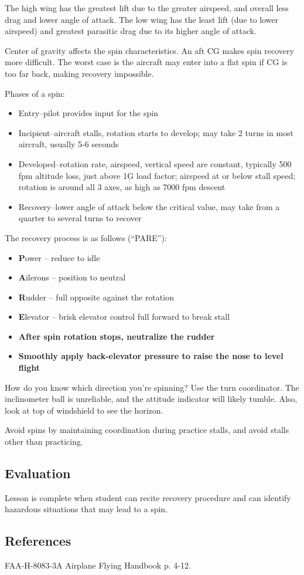 The high wing has the greatest lift due to the greater airspeed, and overall
less drag and lower angle of attack. The low wing has the least lift (due to
lower airspeed) and greatest parasitic drag due to its higher angle of attack.

Center of gravity affects the spin characteristics. An aft CG makes spin
recovery more difficult. The worst case is the aircraft may enter into a flat
spin if CG is too far back, making recovery impossible.

Phases of a spin:
\begin{itemize}
  \item Entry--pilot provides input for the spin
  \item Incipient--aircraft stalls, rotation starts to develop; may take 2
    turns in most aircraft, usually 5-6 seconds
  \item Developed--rotation rate, airspeed, vertical speed are constant,
    typically 500 fpm altitude loss, just above 1G load factor; airspeed at or
    below stall speed; rotation is around all 3 axes, as high as 7000 fpm
    descent
  \item Recovery--lower angle of attack below the critical value, may take from a
    quarter to several turns to recover
\end{itemize}

The recovery process is as follows (``PARE''):
\begin{itemize}
  \item \textbf{P}ower -- reduce to idle
  \item \textbf{A}ilerons -- position to neutral
  \item \textbf{R}udder -- full opposite against the rotation
  \item \textbf{E}levator -- brisk elevator control full forward to break stall
  \item \textbf{After spin rotation stops, neutralize the rudder}
  \item \textbf{Smoothly apply back-elevator pressure to raise the nose to
    level flight}
\end{itemize}

How do you know which direction you're spinning? Use the turn coordinator. The
inclinometer ball is unreliable, and the attitude indicator will likely tumble.
Also, look at top of windshield to see the horizon.

Avoid spins by maintaining coordination during practice stalls, and avoid
stalls other than practicing.

\subsection{Evaluation}

Lesson is complete when student can recite recovery procedure and can identify
hazardous situations that may lead to a spin.

\subsection{References}

FAA-H-8083-3A Airplane Flying Handbook p. 4-12.

